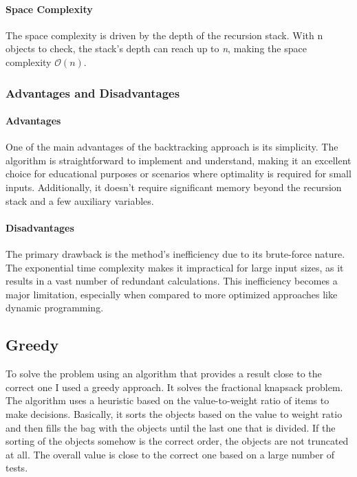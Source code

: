 \documentclass{llncs}
\begin{document}
\paragraph{Space Complexity}
The space complexity is driven by the depth of the recursion stack. With n objects to check, the 
stack's depth can reach up to \textit{n}, making the space complexity $\mathcal{O}(n)$.

\subsubsection{Advantages and Disadvantages}
\paragraph{Advantages}
One of the main advantages of the backtracking approach is its simplicity. The algorithm is
straightforward to implement and understand, making it an excellent choice for educational purposes
or scenarios where optimality is required for small inputs. Additionally, it doesn't require 
significant memory beyond the recursion stack and a few auxiliary variables.

\paragraph{Disadvantages}
The primary drawback is the method's inefficiency due to its brute-force nature. The exponential 
time complexity makes it impractical for large input sizes, as it results in a vast number of
redundant calculations. This inefficiency becomes a major limitation, especially when compared to
more optimized approaches like dynamic programming.


\subsection{Greedy}

To solve the problem using an algorithm that provides a result close to the correct one I used a
greedy approach. It solves the fractional knapsack problem. The algorithm uses a heuristic based on
the value-to-weight ratio of items to make decisions. Basically, it sorts the objects based on the
value to weight ratio and then fills the bag with the objects until the last one that is divided.
If the sorting of the objects somehow is the correct order, the objects are not truncated at all.
The overall value is close to the correct one based on a large number of tests.
\end{document}
